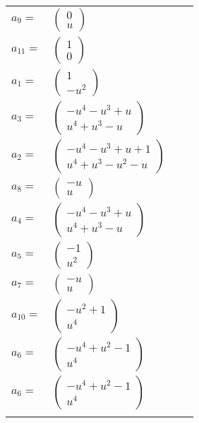 \documentclass[1p]{elsarticle_modified}
\theoremstyle{definition}
\begin{document}
\begin{tabular}{m{7pt} m{180pt} m{7pt} m{180pt} }
\flushright $a_{9}=$&$\begin{pmatrix}0\\u\end{pmatrix}$ \\
\flushright $a_{11}=$&$\begin{pmatrix}1\\0\end{pmatrix}$ \\
\flushright $a_{1}=$&$\begin{pmatrix}1\\- u^2\end{pmatrix}$ \\
\flushright $a_{3}=$&$\begin{pmatrix}- u^4- u^3+u\\u^4+u^3- u\end{pmatrix}$ \\
\flushright $a_{2}=$&$\begin{pmatrix}- u^4- u^3+u+1\\u^4+u^3- u^2- u\end{pmatrix}$ \\
\flushright $a_{8}=$&$\begin{pmatrix}- u\\u\end{pmatrix}$ \\
\flushright $a_{4}=$&$\begin{pmatrix}- u^4- u^3+u\\u^4+u^3- u\end{pmatrix}$ \\
\flushright $a_{5}=$&$\begin{pmatrix}-1\\u^2\end{pmatrix}$ \\
\flushright $a_{7}=$&$\begin{pmatrix}- u\\u\end{pmatrix}$ \\
\flushright $a_{10}=$&$\begin{pmatrix}- u^2+1\\u^4\end{pmatrix}$ \\
\flushright $a_{6}=$&$\begin{pmatrix}- u^4+u^2-1\\u^4\end{pmatrix}$\\ \flushright $a_{6}=$&$\begin{pmatrix}- u^4+u^2-1\\u^4\end{pmatrix}$\\&\end{tabular}
\end{document}
